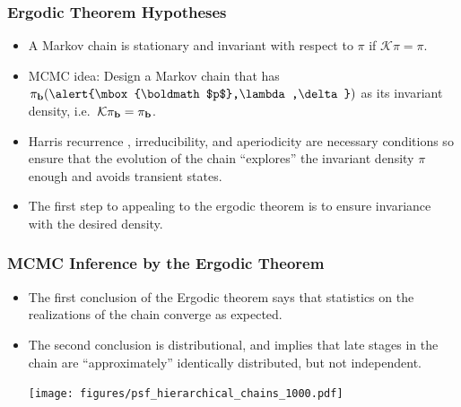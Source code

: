 \documentclass[]{beamer}
\newcommand{\K}{\ensuremath{\mathcal K}}
\newcommand{\bm}[1]{\mbox{\boldmath$#1$}}
\newcommand{\vect}[1]{\bm{#1}}
\begin{document}
\begin{frame}[t]
  \frametitle{Ergodic Theorem Hypotheses}
  \begin{itemize}
    \itemsep 1.2em
    \item A Markov chain is \alert{stationary} and \alert{invariant} with respect to $\pi$ if \alert{$\K \pi = \pi$}.
    \item \alert{MCMC idea:} Design a Markov chain that has $\pib(\alert{\vect p,\lambda,\delta})$ as its invariant density, i.e.~$\K \pib = \pib$.
    \item \alert{Harris recurrence , irreducibility, and aperiodicity} are necessary conditions so ensure that the evolution of the chain ``explores'' the invariant density $\pi$ enough and avoids transient states.
    \item The first step to appealing to the ergodic theorem is to ensure \alert{invariance} with the desired density.
  \end{itemize}
\end{frame}

\begin{frame}[t]
  \frametitle{MCMC Inference by the Ergodic Theorem}
  \begin{itemize}
    \itemsep 1.2em
    \item The first conclusion of the Ergodic theorem says that \alert{statistics} on the realizations of the chain converge as expected.
    \item The second conclusion is \alert{distributional}, and implies that late stages in the chain are ``approximately'' \alert{identically distributed}, but \alert{not independent}.

    \texttt{[image: figures/psf\_hierarchical\_chains\_1000.pdf]}\\
  \end{itemize}
\end{frame}
\end{document}
